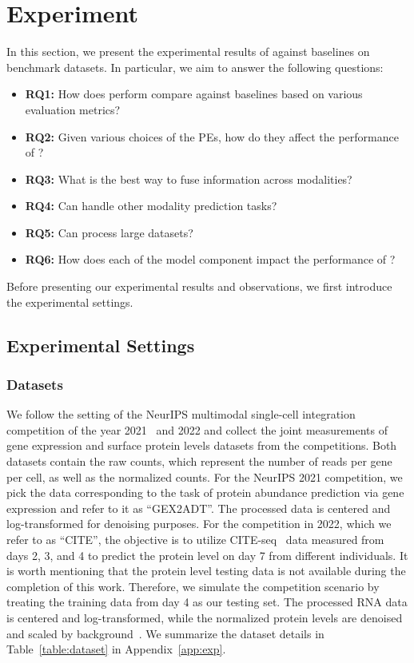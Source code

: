 \section{Experiment}
In this section, we present the experimental results of \method{} against baselines on benchmark datasets. In particular, we aim to answer the following questions:
\begin{itemize}[leftmargin=*]
    \item \textbf{RQ1:} How does \method{} perform compare against baselines based on various evaluation metrics?
    \item \textbf{RQ2:} Given various choices of the PEs, how do they affect the performance of \method{}?
    \item \textbf{RQ3:} What is the best way to fuse information across modalities?
    \item \textbf{RQ4:} Can \method{} handle other modality prediction tasks?
    \item \textbf{RQ5:} Can \method{} process large datasets?
    \item \textbf{RQ6:} How does each of the model component impact the performance of \method{}?
\end{itemize}
Before presenting our experimental results and observations, we first introduce the experimental settings.

\subsection{Experimental Settings}
\subsubsection{Datasets}
We follow the setting of the NeurIPS multimodal single-cell integration competition of the year 2021~\cite{luecken2021sandbox} and 2022
and collect the joint measurements of gene expression and surface protein levels datasets from the competitions. Both datasets contain the raw counts, which represent the number of reads per gene per cell, as well as the normalized counts. For the NeurIPS 2021 competition, we pick the data corresponding to the task of protein abundance prediction via gene expression and refer to it as ``GEX2ADT''. The processed data is centered and log-transformed for denoising purposes. For the competition in 2022, which we refer to as ``CITE'', the objective is to utilize CITE-seq~\cite{stoeckius2017simultaneous} data measured from days 2, 3, and 4 to predict the protein level on day 7 from different individuals. It is worth mentioning that the protein level testing data is not available during the completion of this work. Therefore, we simulate the competition scenario by treating the training data from day 4 as our testing set. The processed RNA data is centered and log-transformed, while the normalized protein levels are denoised and scaled by background~\cite{kotliarov2020broad}. We summarize the dataset details in Table~\ref{table:dataset} in Appendix~\ref{app:exp}. 
% 

